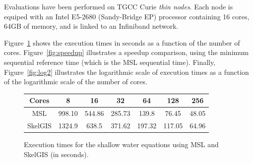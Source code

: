 Evaluations have been performed on TGCC Curie \emph{thin nodes}. Each node is equiped with an Intel E5-2680 (Sandy-Bridge EP) processor containing 16 cores, 64GB of memory, and is linked to an Infiniband network. 

Figure~\ref{fig:times} shows the execution times in seconds as a function of the number of cores. Figure~\ref{fig:speedup} illustrates a speedup comparison, using the minimum sequential reference time (which is the MSL sequential time). Finally, Figure~\ref{fig:log2} illustrates the logarithmic scale of execution times as a function of the logarithmic scale of the number of cores.
\begin{figure}[!h]
 \begin{center}
 \begin{tabular}{c|c|c|c|c|c|c}
   Cores & 8 & 16 & 32 & 64 & 128 & 256\\
   \hline
   MSL & 998.10 & 544.86 & 285.73 & 139.8 & 76.45 & 48.05\\
   \hline
   SkelGIS & 1324.9 & 638.5 & 371.62 & 197.32 & 117.05 & 64.96\\
 \end{tabular}
\caption{Execution times for the shallow water equations using MSL and SkelGIS (in seconds).}
\label{fig:times}
 \end{center}
\end{figure}
